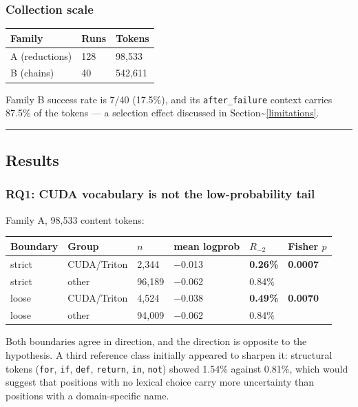 \documentclass[
  11pt,
]{article}
\begin{document}
\hypertarget{collection-scale}{%
\subsubsection{Collection scale}\label{collection-scale}}

\begin{longtable}[]{@{}lll@{}}
\toprule
Family & Runs & Tokens \\
\midrule
\endhead
A (reductions) & 128 & 98,533 \\
B (chains) & 40 & 542,611 \\
\bottomrule
\end{longtable}

Family B success rate is 7/40 (17.5\%), and its \texttt{after\_failure}
context carries 87.5\% of the tokens --- a selection effect discussed in
Section\textasciitilde{}\ref{limitations}.

\begin{center}\rule{0.5\linewidth}{0.5pt}\end{center}

\hypertarget{results}{%
\subsection{Results}\label{results}}

\hypertarget{rq1-cuda-vocabulary-is-not-the-low-probability-tail}{%
\subsubsection{RQ1: CUDA vocabulary is not the low-probability
tail}\label{rq1-cuda-vocabulary-is-not-the-low-probability-tail}}

Family A, 98,533 content tokens:

\begin{longtable}[]{@{}llllll@{}}
\toprule
Boundary & Group & \(n\) & mean logprob & \(R_{-2}\) & Fisher \(p\) \\
\midrule
\endhead
strict & CUDA/Triton & 2,344 & −0.013 & \textbf{0.26\%} &
\textbf{0.0007} \\
strict & other & 96,189 & −0.062 & 0.84\% & \\
loose & CUDA/Triton & 4,524 & −0.038 & \textbf{0.49\%} &
\textbf{0.0070} \\
loose & other & 94,009 & −0.062 & 0.84\% & \\
\bottomrule
\end{longtable}

Both boundaries agree in direction, and the direction is opposite to the
hypothesis. A third reference class initially appeared to sharpen it:
structural tokens (\texttt{for}, \texttt{if}, \texttt{def},
\texttt{return}, \texttt{in}, \texttt{not}) showed 1.54\% against
0.81\%, which would suggest that positions with no lexical choice carry
more uncertainty than positions with a domain-specific name.
\end{document}
